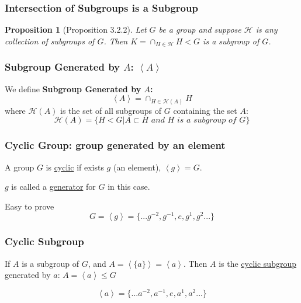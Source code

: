 \documentclass[11pt,a4paper]{article}
\newtheorem{proposition}{Proposition}
\begin{document}
\subsubsection{Intersection of Subgroups is a Subgroup}
\begin{proposition}[Proposition 3.2.2]
Let $G$ be a group and suppose $\mathcal{H}$ is any collection of subgroups of $G$. Then $K=\cap_{H\in\mathcal{H}}H<G$ is a subgroup of $G$.
\end{proposition}


\subsubsection{Subgroup Generated by $A$: $\left\langle A\right\rangle$}
We define \textbf{Subgroup Generated by $A$:} $$\left\langle A\right\rangle=\cap_{H\in\mathcal{H}(A)}H$$
where $\mathcal{H}(A)$ is the set of all subgroups of $G$ containing the set $A$:
$$\mathcal{H}(A)=\{H<G|A\subset H \textit{ and }H \textit{ is a subgroup of } G \}$$


\subsubsection{Cyclic Group: group generated by an element}
A group $G$ is \underline{cyclic} if exists $g$ (an element), $\left\langle g\right\rangle=G$.

$g$ is called a \underline{generator} for $G$ in this case.

Easy to prove
$$G=\left\langle g\right\rangle =\{...g^{-2},g^{-1},e,g^1,g^2...\}$$



\subsubsection{Cyclic Subgroup}
If $A$ is a subgroup of $G$, and $A=\left\langle \{a\}\right\rangle=\left\langle a\right\rangle$. Then $A$ is the \underline{cyclic subgroup} generated by $a$: $A=\left\langle a\right\rangle\leq G$

$$\left\langle a\right\rangle =\{...a^{-2},a^{-1},e,a^1,a^2...\}$$
\end{document}
